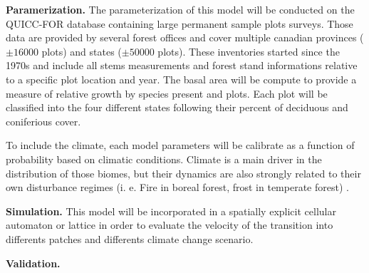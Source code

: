 \textbf{Paramerization.} The parameterization of this model will be conducted
on the QUICC-FOR database containing large permanent sample plots surveys.
Those data are provided by several forest offices and cover multiple canadian
provinces ($\pm16 000$ plots) and states ($\pm50 000$ plots). These
inventories started since the 1970s and include all stems measurements and
forest stand informations relative to a specific plot location and year. The
basal area will be compute to provide a measure of relative growth by species
present and plots. Each plot will be classified into the four different states
following their percent of  deciduous and coniferious cover.   

To include the climate, each model parameters will be calibrate as a
function of probability based on climatic conditions. Climate is a main driver
in the distribution of those biomes, but their dynamics are also strongly related
to their own disturbance regimes (i. e. Fire in boreal forest, frost in
temperate forest) \cite{Goldblum2010}. %

\textbf{Simulation.} This model will be incorporated in a spatially explicit cellular automaton or lattice in
order to evaluate the velocity of the transition into differents patches and differents
climate change scenario.


\textbf{Validation.} 


\newpage






